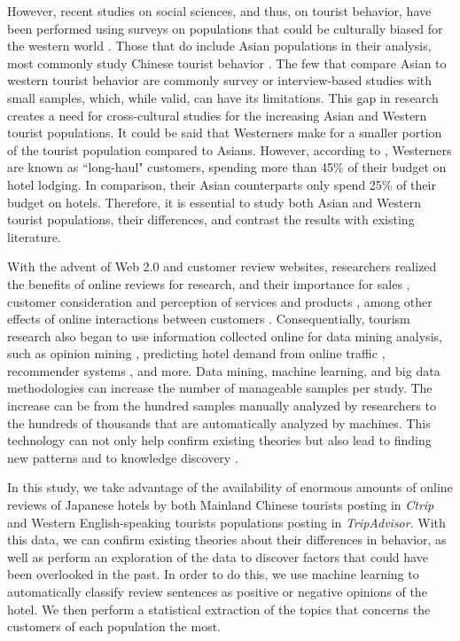 \documentclass[smallextended,natbib]{svjour3}       %
\begin{document}
  However, recent studies on social sciences, and thus, on tourist behavior, have been performed using surveys on populations that could be culturally biased for the western world \cite[][]{nielsen2017, jones2010WEIRD, guaratne2009, hogan1978biases}. Those that do include Asian populations in their analysis, most commonly study Chinese tourist behavior \cite[e.g.][]{liu2019, chang2010, dongyang2015}.  The few that compare Asian to western tourist behavior \cite[e.g.][]{choi2000} are commonly survey or interview-based studies with small samples, which, while valid, can have its limitations. This gap in research creates a need for cross-cultural studies for the increasing Asian and Western tourist populations. It could be said that Westerners make for a smaller portion of the tourist population compared to Asians. However, according to \cite{choi2000}, Westerners are known as ``long-haul" customers, spending more than 45\% of their budget on hotel lodging. In comparison, their Asian counterparts only spend 25\% of their budget on hotels. Therefore, it is essential to study both Asian and Western tourist populations, their differences, and contrast the results with existing literature. 

  With the advent of Web 2.0 and customer review websites, researchers realized the benefits of online reviews for research, and their importance for sales  \cite[][]{ye2009, basuroy2003}, customer consideration \cite[][]{vermeulen2009} and perception of services and products \cite[][]{browning2013}, among other effects of online interactions between customers \cite[e.g.][]{xiang2010, ren2019}. Consequentially, tourism research also began to use information collected online for data mining analysis, such as opinion mining \cite[e.g.][]{hu2017436}, predicting hotel demand from online traffic \cite[][]{yang2014}, recommender systems \cite[e.g.][]{loh2003}, and more. Data mining, machine learning, and big data methodologies can increase the number of manageable samples per study. The increase can be from the hundred samples manually analyzed by researchers to the hundreds of thousands that are automatically analyzed by machines. This technology can not only help confirm existing theories but also lead to finding new patterns and to knowledge discovery \cite[][]{fayyad1996data}. 

  In this study, we take advantage of the availability of enormous amounts of online reviews of Japanese hotels by both Mainland Chinese tourists posting in \textit{Ctrip} and Western English-speaking tourists populations posting in \textit{TripAdvisor}. With this data, we can confirm existing theories about their differences in behavior, as well as perform an exploration of the data to discover factors that could have been overlooked in the past. In order to do this, we use machine learning to automatically classify review sentences as positive or negative opinions of the hotel. We then perform a statistical extraction of the topics that concerns the customers of each population the most.
\end{document}
